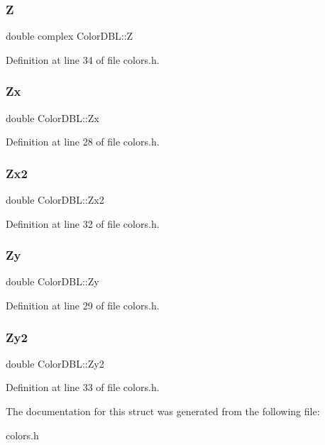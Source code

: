 \subsubsection{\texorpdfstring{Z}{Z}}
{\footnotesize\ttfamily double complex Color\+D\+B\+L\+::Z}



Definition at line 34 of file colors.\+h.

\mbox{\label{struct_color_d_b_l_afc3882aafb004e9426d0672e7c01edaf}} 
\subsubsection{\texorpdfstring{Zx}{Zx}}
{\footnotesize\ttfamily double Color\+D\+B\+L\+::\+Zx}



Definition at line 28 of file colors.\+h.

\mbox{\label{struct_color_d_b_l_a6125ad69bdbe0f5e1d8e661c522ffe6f}} 
\subsubsection{\texorpdfstring{Zx2}{Zx2}}
{\footnotesize\ttfamily double Color\+D\+B\+L\+::\+Zx2}



Definition at line 32 of file colors.\+h.

\mbox{\label{struct_color_d_b_l_a295cfca80e80dc85e9ae1b13194a0287}} 
\subsubsection{\texorpdfstring{Zy}{Zy}}
{\footnotesize\ttfamily double Color\+D\+B\+L\+::\+Zy}



Definition at line 29 of file colors.\+h.

\mbox{\label{struct_color_d_b_l_a0a80ad80b28ffc36cded142c1a1329a0}} 
\subsubsection{\texorpdfstring{Zy2}{Zy2}}
{\footnotesize\ttfamily double Color\+D\+B\+L\+::\+Zy2}



Definition at line 33 of file colors.\+h.



The documentation for this struct was generated from the following file\+:\begin{DoxyCompactItemize}
\item 
colors.\+h\end{DoxyCompactItemize}
